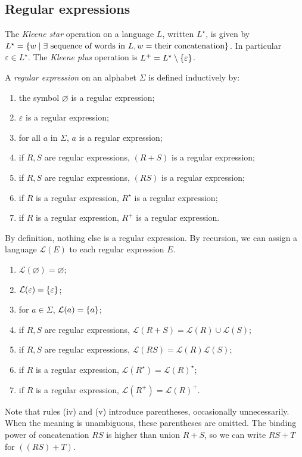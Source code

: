 \subsection{Regular expressions}
\begin{definition}
	The \emph{Kleene star} operation on a language \( L \), written \( L^\star \), is given by \( L^\star = \qty{w \mid \exists \text{ sequence of words in } L, w = \text{their concatenation}} \).
	In particular \( \varepsilon \in L^\star \).
	The \emph{Kleene plus} operation is \( L^+ = L^\star \setminus \qty{\varepsilon} \).
\end{definition}
\begin{definition}
	A \emph{regular expression} on an alphabet \( \Sigma \) is defined inductively by:
	\begin{enumerate}
		\item the symbol \( \varnothing \) is a regular expression;
		\item \( \varepsilon \) is a regular expression;
		\item for all \( a \) in \( \Sigma \), \( a \) is a regular expression;
		\item if \( R, S \) are regular expressions, \( (R + S) \) is a regular expression;
		\item if \( R, S \) are regular expressions, \( (R S) \) is a regular expression;
		\item if \( R \) is a regular expression, \( R^\star \) is a regular expression;
		\item if \( R \) is a regular expression, \( R^+ \) is a regular expression.
	\end{enumerate}
	By definition, nothing else is a regular expression.
	By recursion, we can assign a language \( \mathcal L(E) \) to each regular expression \( E \).
	\begin{enumerate}
		\item \( \mathcal L(\varnothing) = \varnothing \);
		\item \( \mathcal L(\varepsilon) = \qty{\varepsilon} \);
		\item for \( a \in \Sigma \), \( \mathcal L(a) = \qty{a} \);
		\item if \( R, S \) are regular expressions, \( \mathcal L(R + S) = \mathcal L(R) \cup \mathcal L(S) \);
		\item if \( R, S \) are regular expressions, \( \mathcal L(R S) = \mathcal L(R) \mathcal L(S) \);
		\item if \( R \) is a regular expression, \( \mathcal L(R^\star) = \mathcal L(R)^\star \);
		\item if \( R \) is a regular expression, \( \mathcal L(R^+) = \mathcal L(R)^+ \).
	\end{enumerate}
\end{definition}
Note that rules (iv) and (v) introduce parentheses, occasionally unnecessarily.
When the meaning is unambiguous, these parentheses are omitted.
The binding power of concatenation \( RS \) is higher than union \( R + S \), so we can write \( RS + T \) for \( ((RS) + T) \).

